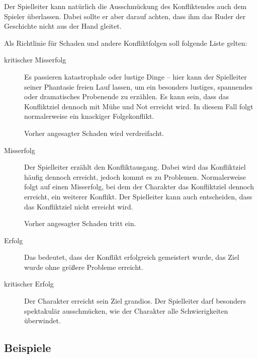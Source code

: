 Der Spielleiter kann natürlich die Ausschmückung des Konfliktendes auch dem Spieler überlassen. Dabei sollte er aber darauf achten, dass ihm das Ruder der Geschichte nicht aus der Hand gleitet.

Als Richtlinie für Schaden und andere Konfliktfolgen soll folgende Liste gelten:

\begin{description}
  \item[kritischer Misserfolg] Es passieren katastrophale oder lustige Dinge -- hier kann der Spielleiter seiner Phantasie freien Lauf lassen, um ein besonders lustiges, spannendes oder dramatisches Probenende zu erzählen. Es kann sein, dass das Konfliktziel dennoch mit Mühe und Not erreicht wird. In diesem Fall folgt normalerweise ein knackiger Folgekonflikt.
  
  Vorher angesagter Schaden wird verdreifacht.

  \item[Misserfolg] Der Spielleiter erzählt den Konfliktausgang. Dabei wird das Konfliktziel häufig dennoch erreicht, jedoch kommt es zu Problemen. Normalerweise folgt auf einen Misserfolg, bei dem der Charakter das Konfliktziel dennoch erreicht, ein weiterer Konflikt. Der Spielleiter kann auch entscheiden, dass das Konfliktziel nicht erreicht wird.
  
  Vorher angesagter Schaden tritt ein.

  \item[Erfolg] Das bedeutet, dass der Konflikt erfolgreich gemeistert wurde, das Ziel wurde ohne größere Probleme erreicht.

  \item[kritischer Erfolg] Der Charakter erreicht sein Ziel grandios. Der Spielleiter darf besonders spektakulär ausschmücken, wie der Charakter alle Schwierigkeiten überwindet.
\end{description}

\subsection{Beispiele}

